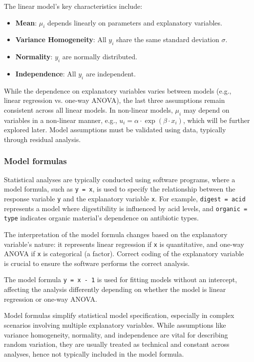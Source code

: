 \documentclass{article}
\begin{document}
The linear model's key characteristics include:

\begin{itemize}
    \item \textbf{Mean}: $\mu_i$ depends linearly on parameters and explanatory variables.
    \item \textbf{Variance Homogeneity}: All $y_i$ share the same standard deviation $\sigma$.
    \item \textbf{Normality}: $y_i$ are normally distributed.
    \item \textbf{Independence}: All $y_i$ are independent.
\end{itemize}

While the dependence on explanatory variables varies between models (e.g., linear regression vs. one-way ANOVA), the last three assumptions remain consistent across all linear models. In non-linear models, $\mu_i$ may depend on variables in a non-linear manner, e.g., $u_i=\alpha \cdot \exp (\beta \cdot x_i)$, which will be further explored later. Model assumptions must be validated using data, typically through residual analysis.

\subsubsection{Model formulas}

Statistical analyses are typically conducted using software programs, where a model formula, such as \verb|y = x|, is used to specify the relationship between the response variable \verb|y| and the explanatory variable \verb|x|. For example, \verb|digest = acid| represents a model where digestibility is influenced by acid levels, and \verb|organic =| \verb|type| indicates organic material's dependence on antibiotic types.

The interpretation of the model formula changes based on the explanatory variable's nature: it represents linear regression if \verb|x| is quantitative, and one-way ANOVA if \verb|x| is categorical (a factor). Correct coding of the explanatory variable is crucial to ensure the software performs the correct analysis.

The model formula \verb|y = x - 1| is used for fitting models without an intercept, affecting the analysis differently depending on whether the model is linear regression or one-way ANOVA.

Model formulas simplify statistical model specification, especially in complex scenarios involving multiple explanatory variables. While assumptions like variance homogeneity, normality, and independence are vital for describing random variation, they are usually treated as technical and constant across analyses, hence not typically included in the model formula.
\end{document}
